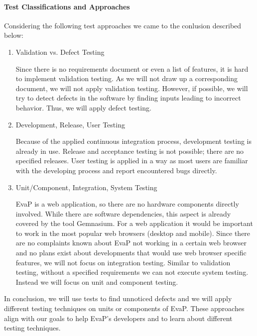 \paragraph{Test Classifications and Approaches}
Considering the following test approaches we came to the conlusion described below:
\begin{enumerate}
    \item Validation vs. Defect Testing
    
    Since there is no requirements document or even a list of features, it is hard to implement validation testing.
    As we will not draw up a corresponding document, we will not apply validation testing.
    However, if possible, we will try to detect defects in the software by finding inputs leading to incorrect behavior.
    Thus, we will apply defect testing.

    \item Development, Release, User Testing 
    
    Because of the applied continuous integration process, development testing is already in use.
    Release and acceptance testing is not possible; there are no specified releases.
    User testing is applied in a way as most users are familiar with the developing process and report encountered bugs directly.

    \item Unit/Component, Integration, System Testing
    
    EvaP is a web application, so there are no hardware components directly involved.
    While there are software dependencies, this aspect is already covered by the tool Gemnasium.
    For a web application it would be important to work in the most popular web browsers (desktop and mobile).
    Since there are no complaints known about EvaP not working in a certain web browser and no plans exist about developments that would use web browser specific features, we will not focus on integration testing.
    Similar to validation testing, without a specified requirements we can not execute system testing.
    Instead we will focus on unit and component testing. 
\end{enumerate}
In conclusion, we will use tests to find unnoticed defects and we will apply different testing techniques on units or components of EvaP.
These approaches align with our goals to help EvaP's developers and to learn about different testing techniques.

